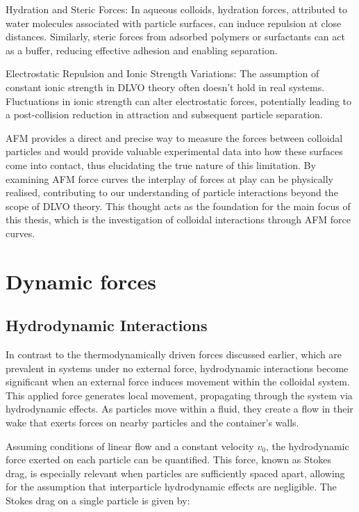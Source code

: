 Hydration and Steric Forces: In aqueous colloids, hydration forces, attributed to water molecules associated with particle surfaces, can induce repulsion at close distances. Similarly, steric forces from adsorbed polymers or surfactants can act as a buffer, reducing effective adhesion and enabling separation.

Electrostatic Repulsion and Ionic Strength Variations: The assumption of constant ionic strength in DLVO theory often doesn't hold in real systems. Fluctuations in ionic strength can alter electrostatic forces, potentially leading to a post-collision reduction in attraction and subsequent particle separation.

 AFM provides a direct and precise way to measure the forces between colloidal particles and would provide valuable experimental data into how these surfaces come into contact, thus elucidating the true nature of this limitation. By examining AFM force curves the interplay of forces at play can be physically realised, contributing to our understanding of particle interactions beyond the scope of DLVO theory. This thought acts as the foundation for the main focus of this thesis, which is the investigation of colloidal interactions through AFM force curves. \cite{ducker1994hydrophobic} \cite{antonyuk2019particles} \cite{israelachvili2011intermolecular}


\section{Dynamic forces}

\subsection{Hydrodynamic Interactions}

In contrast to the thermodynamically driven forces discussed earlier, which are prevalent in systems under no external force, hydrodynamic interactions become significant when an external force induces movement within the colloidal system. This applied force generates local movement, propagating through the system via hydrodynamic effects. As particles move within a fluid, they create a flow in their wake that exerts forces on nearby particles and the container's walls.

Assuming conditions of linear flow and a constant velocity \( v_0 \), the hydrodynamic force exerted on each particle can be quantified. This force, known as Stokes drag, is especially relevant when particles are sufficiently spaced apart, allowing for the assumption that interparticle hydrodynamic effects are negligible. The Stokes drag on a single particle is given by:

